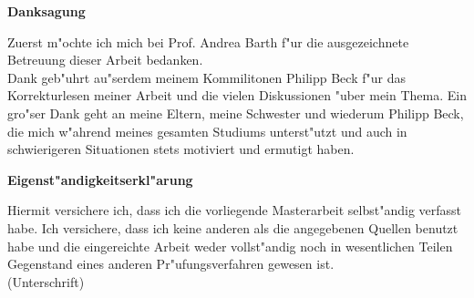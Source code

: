 \documentclass[12pt,twoside]{scrartcl}
\theoremstyle{satz}
\theoremstyle{bsp}
\begin{document}
 
\newpage 
\thispagestyle{empty}
\quad  
\newpage
\thispagestyle{empty}
\begin{center}
\textbf{\Large{Danksagung}}\\[2cm]
\begin{flushleft}
Zuerst m"ochte ich mich bei Prof. Andrea Barth f"ur die ausgezeichnete Betreuung dieser Arbeit bedanken. \\
Dank geb"uhrt au"serdem meinem Kommilitonen Philipp Beck f"ur das Korrekturlesen meiner Arbeit und die vielen Diskussionen "uber mein Thema.
Ein gro"ser Dank geht an meine Eltern, meine Schwester und wiederum Philipp Beck, die mich w"ahrend meines gesamten Studiums unterst"utzt und auch in schwierigeren Situationen stets motiviert und ermutigt haben.
\end{flushleft}
\end{center}\vspace{2cm}
\newpage 
\thispagestyle{empty}
\quad  
\newpage
\fancyfoot[C]{}
\tableofcontents
\newpage
\thispagestyle{empty}
\fancyfoot[C]{\thepage}

\quad  
\newpage

\newpage

\newpage 
\thispagestyle{empty}
\quad  
\newpage

\newpage 
\thispagestyle{empty}
\quad  
\newpage

\newpage

\newpage 



\newpage

\newpage 
\thispagestyle{empty}
\quad  
\newpage


\newpage


\newpage



\newpage 
\thispagestyle{empty}
\quad  
\newpage
\nocite{*}


\newpage 
\thispagestyle{empty}
\quad  
\newpage
\thispagestyle{empty}
\begin{center}\Large{\textbf{Eigenst"andigkeitserkl"arung}} \end{center}\vspace{2cm}
Hiermit versichere ich, dass ich die vorliegende Masterarbeit selbst"andig verfasst habe.
Ich versichere, dass ich keine anderen als die angegebenen Quellen benutzt habe und  die eingereichte Arbeit weder vollst"andig noch in wesentlichen Teilen Gegenstand eines anderen Pr"ufungsverfahren gewesen ist.\\[2cm]
(Unterschrift)
\end{document}
